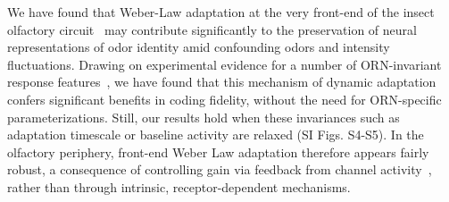 \documentclass[10pt,prl,aps,showpacs,twocolumn,unsortedaddress]{revtex4-1}
\begin{document}
We have found that Weber-Law adaptation at the very front-end of the insect olfactory circuit~\cite{srinivas_elife,cafaro_WL,cao_WL} may contribute significantly to the preservation of neural representations of odor identity amid confounding odors and intensity fluctuations. Drawing on experimental evidence for a number of ORN-invariant response features~\cite{nagel_wilson_biophysical,martelli,stevens,srinivas_elife,si2017invariances}, we have found that this mechanism of dynamic adaptation confers significant benefits in coding fidelity, without the need for ORN-specific parameterizations. Still, our results hold when these invariances such as adaptation timescale or baseline activity are relaxed (SI Figs. S4-S5). In the olfactory periphery, front-end Weber Law adaptation therefore appears fairly robust, a consequence of controlling gain via feedback from channel activity~\cite{EmonetReview,nagel_wilson_biophysical,srinivas_elife}, rather than through intrinsic, receptor-dependent mechanisms. 
\end{document}
